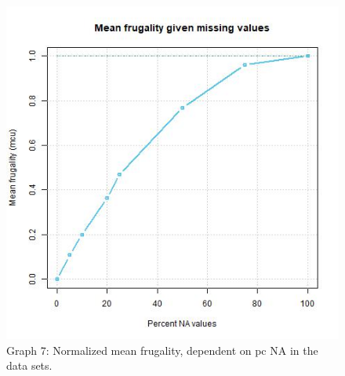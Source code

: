 \documentclass[
]{article}
\begin{document}
\begin{figure}
\centering
\includegraphics{graphs/meanfrugality.jpg}
\caption{Graph 7: Normalized mean frugality, dependent on pc NA in the
data sets.}
\end{figure}
\end{document}
